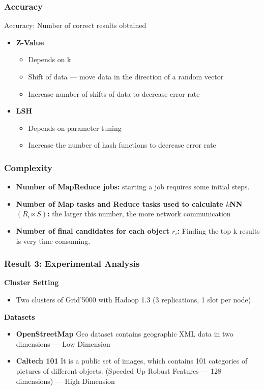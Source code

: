 \begin{frame}
\frametitle{Accuracy}
Accuracy: Number of correct results obtained
\begin{itemize}
\item \textbf{Z-Value}
\begin{itemize}
\item Depends on k
\item Shift of data --- move data in the direction of a random vector
\item Increase number of shifts of data to decrease error rate
\end{itemize}
\item \textbf{LSH}
\begin{itemize}
\item Depends on parameter tuning
\item Increase the number of hash functions to decrease error rate
\end{itemize}
\end{itemize}
\end{frame}


\begin{frame}
\frametitle{Complexity}

\begin{itemize}
\item \textbf{Number of MapReduce jobs: } starting a job requires some initial steps.

\item \textbf{Number of Map tasks and Reduce tasks used to calculate $k$NN$\left(R_i \ltimes S\right)$: } the larger this number, the more network communication

\item \textbf{Number of final candidates for each object $r_i$: }  Finding the top k results is very time consuming. 
\end{itemize}
\end{frame}


\begin{frame}
\frametitle{Result 3: Experimental Analysis}
\textbf{Cluster Setting}
\vspace{-0.1in}
\begin{itemize}
\item Two clusters of Grid'5000 with Hadoop 1.3 (3 replications, 1 slot per node)

\end{itemize}
\textbf{Datasets}
\vspace{-0.1in}
\begin{itemize}
\item \textbf{OpenStreetMap} Geo dataset contains geographic XML data in two dimensions  --- Low Dimension
\item \textbf{Caltech 101} It is a public set of images, which contains 101 categories of pictures of different objects. (Speeded Up Robust Features --- 128 dimensions) --- High Dimension
\end{itemize}
\end{frame}

